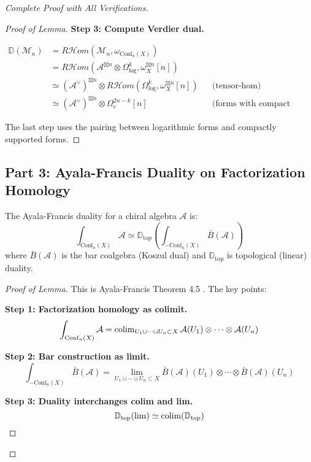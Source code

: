 \begin{proof}[Complete Proof with All Verifications]
\begin{proof}[Proof of Lemma]
\textbf{Step 3: Compute Verdier dual.}

\begin{align*}
\mathbb{D}(\mathcal{M}_n) 
&= R\mathcal{H}om(\mathcal{M}_n, \omega_{\text{Conf}_n(X)}) \\
&= R\mathcal{H}om(\mathcal{A}^{\boxtimes n} \otimes \Omega^k_{\log}, \omega_X^{\boxtimes n}[n]) \\
&\simeq (\mathcal{A}^\vee)^{\boxtimes n} \otimes R\mathcal{H}om(\Omega^k_{\log}, \omega_X^{\boxtimes n}[n]) && \text{(tensor-hom)} \\
&\simeq (\mathcal{A}^\vee)^{\boxtimes n} \otimes \Omega^{2n-k}_c[n] && \text{(forms with compact support)}
\end{align*}

The last step uses the pairing between logarithmic forms and compactly supported forms. \qedhere
\end{proof}

\subsection*{Part 3: Ayala-Francis Duality on Factorization Homology}

\begin{lemma}\label{lem:AF-dual-chiral}
The Ayala-Francis duality for a chiral algebra $\mathcal{A}$ is:
$$\int_{\text{Conf}_n(X)} \mathcal{A} \simeq \mathbb{D}_{\text{top}}\left(\int_{-\text{Conf}_n(X)} \bar{B}(\mathcal{A})\right)$$
where $\bar{B}(\mathcal{A})$ is the bar coalgebra (Koszul dual) and $\mathbb{D}_{\text{top}}$ is topological (linear) duality.
\end{lemma}

\begin{proof}[Proof of Lemma]
This is Ayala-Francis Theorem 4.5 \cite{AF15}. The key points:

\textbf{Step 1: Factorization homology as colimit.}
$$\int_{\text{Conf}_n(X)} \mathcal{A} = \operatorname{colim}_{U_1 \sqcup \cdots \sqcup U_n \subset X} \mathcal{A}(U_1) \otimes \cdots \otimes \mathcal{A}(U_n)$$

\textbf{Step 2: Bar construction as limit.}
$$\int_{-\text{Conf}_n(X)} \bar{B}(\mathcal{A}) = \lim_{U_1 \sqcup \cdots \sqcup U_n \subset X} \bar{B}(\mathcal{A})(U_1) \otimes \cdots \otimes \bar{B}(\mathcal{A})(U_n)$$

\textbf{Step 3: Duality interchanges colim and lim.}
$$\mathbb{D}_{\text{top}}(\lim) \simeq \operatorname{colim}(\mathbb{D}_{\text{top}})$$


\end{proof}
\end{proof}
